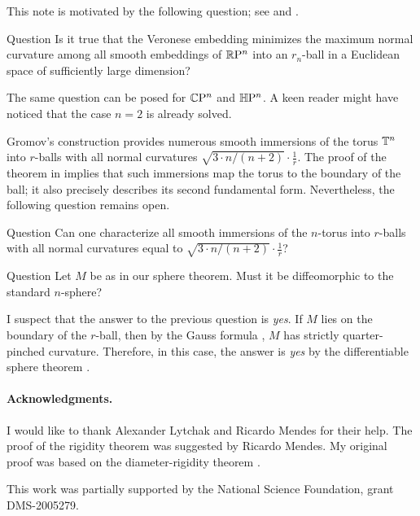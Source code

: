 \documentclass[a4paper,10pt]{article}
\begin{document}
This note is motivated by the following question; see \cite[1.4]{petrunin2024a} and \cite{petrunin2023}.

\begin{thm}{Question}
Is it true that the Veronese embedding minimizes the maximum normal curvature among all smooth embeddings of \(\mathbb{R}\mathrm{P}^n\) into an \(r_n\)-ball in a Euclidean space of sufficiently large dimension?
\end{thm}

The same question can be posed for \( \mathbb{C}\mathrm{P}^n \) and \( \mathbb{H}\mathrm{P}^n \).
A keen reader might have noticed that the case $n=2$ is already solved.

Gromov's construction provides numerous smooth immersions of the torus \( \mathbb{T}^n \) into \( r \)-balls with all normal curvatures \( \sqrt{3\cdot n/(n+2)}\cdot\tfrac{1}{r}\).
The proof of the theorem in \cite{petrunin2024a} implies that such immersions map the torus to the boundary of the ball;
it also precisely describes its second fundamental form.
Nevertheless, the following question remains open.


\begin{thm}{Question}
Can one characterize all smooth immersions of the $n$-torus into $r$-balls
with all normal curvatures equal to $\sqrt{3\cdot n/(n+2)}\cdot\tfrac{1}{r}$?
\end{thm}

\begin{thm}{Question}
Let \( M \) be as in our sphere theorem.
Must it be diffeomorphic to the standard \( n \)-sphere?
\end{thm}

I suspect that the answer to the previous question is \textit{yes}.
If $M$ lies on the boundary of the $r$-ball, then by the Gauss formula \cite[Lemma 5]{petrunin2024}, $M$ has strictly quarter-pinched curvature.
Therefore, in this case, the answer is \textit{yes} by the differentiable sphere theorem \cite{brendle-schoen}.

\paragraph{Acknowledgments.}
I would like to thank Alexander Lytchak and Ricardo Mendes for their help.
The proof of the rigidity theorem was suggested by Ricardo Mendes.
My original proof was based on the diameter-rigidity theorem \cite{gromoll-grove,wilking}.

This work was partially supported by the National Science Foundation, grant DMS-2005279.


{\sloppy
\def\emph{\textit}
\printbibliography[heading=bibintoc]
\fussy
}
\end{document}
